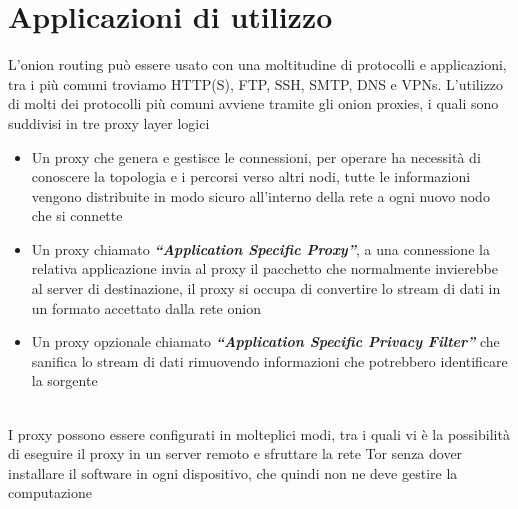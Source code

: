 \newpage
\section{Applicazioni di utilizzo}
L'onion routing può essere usato con una moltitudine di protocolli e applicazioni, tra i più comuni troviamo HTTP(S), FTP, SSH, SMTP, DNS e VPNs. L'utilizzo di molti dei protocolli più comuni avviene tramite gli onion proxies, i quali sono suddivisi in tre proxy layer logici
\begin{itemize}
    \item Un proxy che genera e gestisce le connessioni, per operare ha necessità di conoscere la topologia e i percorsi verso altri nodi, tutte le informazioni vengono distribuite in modo sicuro all'interno della rete a ogni nuovo nodo che si connette 
    \item Un proxy chiamato \emph{\textbf{“Application Specific Proxy”}}, a una connessione la relativa applicazione invia al proxy il pacchetto che normalmente invierebbe al server di destinazione, il proxy si occupa di convertire lo stream di dati in un formato accettato dalla rete onion
    \item Un proxy opzionale chiamato \emph{\textbf{“Application Specific Privacy Filter”}} che sanifica lo stream di dati rimuovendo informazioni che potrebbero identificare la sorgente
\end{itemize}

\cite{OnionRouting} \\
I proxy possono essere configurati in molteplici modi, tra i quali vi è la possibilità di eseguire il proxy in un server remoto e sfruttare la rete Tor senza dover installare il software in ogni dispositivo, che quindi non ne deve gestire la computazione

\newpage
